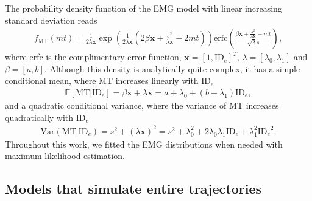 \documentclass[acmlarge, manuscript,review]{acmart}
\newcommand{\mmt}{\ensuremath{\overline{\mt}}\xspace}
\newcommand{\mt}{\ensuremath{{\text{MT}}}\xspace}
\newcommand{\ide}{\ensuremath{{\text{ID}_e}}\xspace}
\begin{document}
The probability density function of the EMG model with linear increasing standard deviation reads
\begin{align}
	f_{\mt}(mt) = \frac{1}{2\lambda\mathbf{x}} \exp\left(\frac{1}{2\lambda\mathbf{x}}(2\beta\mathbf{x} + \frac{s^2}{\lambda\mathbf{x}} - 2mt)\right) \mathrm{erfc}\left(\frac{\beta\mathbf{x} + \frac{s^2}{\lambda\mathbf{x}} - mt}{\sqrt{2} s}\right),
\end{align}
where erfc is the complimentary error function, $\mathbf{x} = \left[1, \ide \right]^T$, $\lambda = \left[ \lambda_0, \lambda_1 \right]$ and $\beta = \left[ a, b\right]$. Although this density is analytically quite complex, it has a simple conditional mean, where \mmt increases linearly with \ide
\begin{align}
	\mathbb{E}[\mt|\ide] = \beta \mathbf{x} + \lambda \mathbf{x} = a + \lambda_0 + (b + \lambda_1) \ide, \label{eq:emg_mean}
\end{align}
and a quadratic conditional variance, where the variance of MT increases quadratically with \ide
\begin{align}
	\text{Var}(\mt|\ide) = s^2 + (\lambda \mathbf{x})^2 = s^2 + \lambda_0^2 + 2\lambda_0\lambda_1\ide + \lambda_1^2\ide^2. \label{eq:emg_conditional_variance}
\end{align}
Throughout this work, we fitted the EMG distributions when needed with maximum likelihood estimation. 







\subsection{Models that simulate entire trajectories\label{rw:simulators}}
\end{document}
